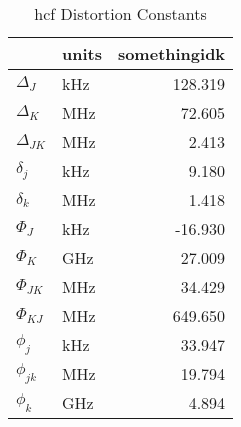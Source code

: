 \begin{table}
\centering
\caption{hcf Distortion Constants}
\label{hcf_dis}
\begin{tabular}{llr}
\toprule
 & units & somethingidk \\
\midrule
$\Delta_J$ & kHz & 128.319 \\
$\Delta_K$ & MHz & 72.605 \\
$\Delta_{JK}$ & MHz & 2.413 \\
$\delta_j$ & kHz & 9.180 \\
$\delta_k$ & MHz & 1.418 \\
$\Phi_J$ & kHz & -16.930 \\
$\Phi_K$ & GHz & 27.009 \\
$\Phi_{JK}$ & MHz & 34.429 \\
$\Phi_{KJ}$ & MHz & 649.650 \\
$\phi_j$ & kHz & 33.947 \\
$\phi_{jk}$ & MHz & 19.794 \\
$\phi_k$ & GHz & 4.894 \\
\bottomrule
\end{tabular}
\end{table}
